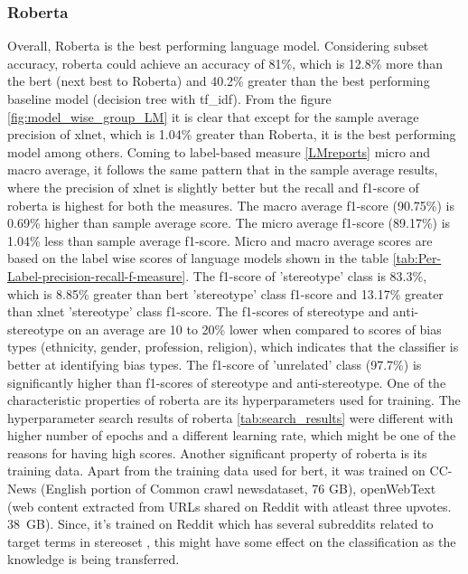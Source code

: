 \subsubsection{Roberta}
Overall, Roberta is the best performing language model. Considering subset accuracy, roberta could achieve an accuracy of 81\%, which is 12.8\% more than the bert (next best to Roberta) and 40.2\% greater than the best performing baseline model (decision tree with tf\_idf). From the figure \ref{fig:model_wise_group_LM} it is clear that except for the sample average precision of xlnet, which is 1.04\% greater than Roberta, it is the best performing model among others. Coming to label-based measure \ref{LMreports} micro and macro average, it follows the same pattern that in the sample average results, where the precision of xlnet is slightly better but the recall and f1-score of roberta is highest for both the measures. The macro average f1-score (90.75\%) is 0.69\% higher than sample average score. The micro average f1-score (89.17\%) is 1.04\% less than sample average f1-score. Micro and macro average scores are based on the label wise scores of language models shown in the table \ref{tab:Per-Label-precision-recall-f-measure}. The  f1-score of 'stereotype' class is 83.3\%, which is 8.85\% greater than bert 'stereotype' class f1-score and 13.17\% greater than xlnet 'stereotype' class f1-score. The f1-scores of stereotype and anti-stereotype on an average are 10 to 20\% lower when compared to scores of bias types (ethnicity, gender, profession, religion), which indicates that the classifier is better at identifying bias types. The f1-score of 'unrelated' class (97.7\%) is significantly higher than f1-scores of stereotype and anti-stereotype. One of the characteristic properties of roberta are its hyperparameters used for training. The hyperparameter search results of roberta \ref{tab:search_results} were different with higher number of epochs and a different learning rate, which might be one of the reasons for having high scores. Another significant property of roberta is its training data. Apart from the training data used for bert, it was trained on CC-News (English portion of Common crawl newsdataset, 76 GB), openWebText (web content extracted from URLs shared on Reddit with atleast three upvotes. 38 GB). Since, it's trained on Reddit which has several subreddits related to target terms in stereoset \cite{nadeem2020stereoset}, this might have some effect on the classification as the knowledge is being transferred. 


